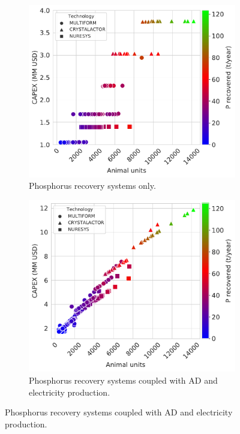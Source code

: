 \begin{refsection}[referencesCh4]
\begin{figure}[h]
	\begin{subfigure}[t]{0.48\linewidth}
		\includegraphics[width=\linewidth]{gfx/Chapter4/Capital_TechSelected_Pcredits22_REC0.pdf} 
		\caption{Phosphorus recovery systems only.}
		\label{fig:Capital_TechSelected_Pcredits22_REC0}
	\end{subfigure}
	\quad
	\begin{subfigure}[t]{0.48\linewidth}
		\includegraphics[width=\linewidth]{gfx/Chapter4/Capital_TechSelected_Pcredits22_REC60.pdf}
		\caption{Phosphorus recovery systems coupled with AD and electricity production.}
		\label{fig:Capital_TechSelected_Pcredits22_REC60}
	\end{subfigure}
	

\end{figure}
\end{refsection}
